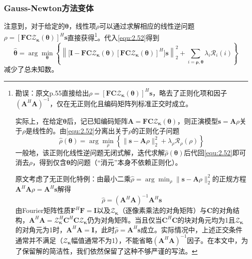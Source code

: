 \documentclass[12pt]{article}
\begin{document}
\subsubsection{Gauss-Newton方法变体}
注意到，对于给定的$\bm{\theta}$，线性项$\rho$可以通过求解相应的线性逆问题$\rho = [\mathbf{F}\mathbf{C}\mathcal{Z}_{\bm{\kappa}}(\bm{\theta})]^H \bm{s}$直接获得\footnote{勘误：原文p.55直接给出$\rho=[\mathbf{F}\mathbf{C}\mathcal{Z}_{\bm{\kappa}}(\bm{\theta})]^H\bm{s}$，略去了正则化项和因子$(\mathbf{A}^H\mathbf{A})^{-1}$，仅在无正则化且编码矩阵列标准正交时成立。

实际上，在给定$\bm{\theta}$后，记已知编码矩阵$\mathbf{A}=\mathbf{F}\mathbf{C}\mathcal{Z}_{\bm{\kappa}}(\bm{\theta})$，则正演模型$\bm{s}=\mathbf{A}\rho$关于$\rho$是线性的。由\autoref{equ:2.52}分离出关于$\rho$的正则化子问题
\begin{equation}
    \hat{\rho}(\bm{\theta})=\arg\min_{\rho}\left\{\|\bm{s}-\mathbf{A}\rho\|_2^2+\lambda_\rho\mathcal{R}_\rho(\rho)\right\}
\end{equation}
一般地，该正则化线性逆问题无闭式解，迭代求解$\hat{\rho}(\bm{\theta})$后代回\autoref{equ:2.52}即可消去$\rho$，得到仅含$\bm{\theta}$的问题（“消元”本身不依赖正则化）。

原文考虑了无正则化特例：由最小二乘$\hat{\rho}=\arg\min_{\rho}\|\bm{s}-\mathbf{A}\rho\|_2^2$的正规方程$\mathbf{A}^H\mathbf{A}\rho=\mathbf{A}^H\bm{s}$解得
\begin{equation}
    \hat{\rho}=(\mathbf{A}^H\mathbf{A})^{-1}\mathbf{A}^H\bm{s}
\end{equation}
由Fourier矩阵性质$\mathbf{F}^H\mathbf{F}=\mathbf{I}$以及$\mathcal{Z}_{\bm{\kappa}}$（逐像素乘法的对角矩阵）与$\mathbf{C}$的对角结构，$\mathbf{A}^H\mathbf{A}=\mathcal{Z}_{\bm{\kappa}}^H\mathbf{C}^H\mathbf{C}\mathcal{Z}_{\bm{\kappa}}$仍为对角矩阵。当且仅当$\mathbf{C}^H\mathbf{C}$的块对角元均为1且$\mathcal{Z}_{\bm{\kappa}}$的对角元为1时，$\mathbf{A}^H\mathbf{A}=\mathbf{I}$，此时$\hat{\rho}=\mathbf{A}^H\bm{s}$成立。实际情况中，上述正交条件通常并不满足（$\mathcal{Z}_{\bm{\kappa}}$幅值通常不为1），不能省略$(\mathbf{A}^H\mathbf{A})^{-1}$因子。在本文中，为了保留解的简洁性，我们依然保留了这种不够严谨的写法。}。代入\autoref{equ:2.52}得到
\begin{equation}
    \hat{\bm{\theta}}=\arg\min_{\bm{\theta}} \left\{\left\|\big[\mathbf{I}-\mathbf{F}\mathbf{C}\mathcal{Z}_{\bm{\kappa}}(\bm{\theta})[\mathbf{F}\mathbf{C}\mathcal{Z}_{\bm{\kappa}}(\bm{\theta})]^H\big]\bm{s}\right\|_2^2+\sum_{i=\bm{\rho},\bm{\theta}} \lambda_i\mathcal{R}_i(i)\right\}
    \label{equ:2.54}
\end{equation}
减少了总未知数。
\end{document}
